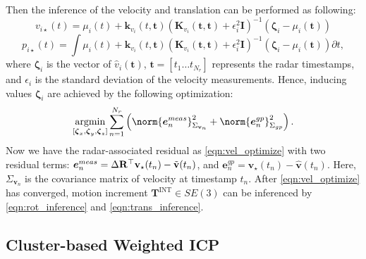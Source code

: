 Then the inference of the velocity and translation can be performed as following:
\vspace{-1mm}
\begin{equation}
    {v}_{i\star}(t)=\mu_i(t)+\mathbf{k}_{v_i}(t,\mathbf{t})(\mathbf{K}_{v_i}(\mathbf{t}, \mathbf{t})+\epsilon_i^2\mathbf{I})^{-1}(\boldsymbol{\zeta}_i-\mu_i(\mathbf{t}))
\end{equation}
\begin{equation}
\label{eqn:trans_inference}
    {p}_{i\star}(t)=\int \mu_i(t)+\mathbf{k}_{v_i}(t,\mathbf{t})(\mathbf{K}_{v_i}(\mathbf{t}, \mathbf{t})+\epsilon_i^2\mathbf{I})^{-1}(\boldsymbol{\zeta}_i-\mu_i(\mathbf{t})) \partial t,
\end{equation}
where $\boldsymbol{\zeta}_i$ is the vector of $\hat{v}_i(\mathbf{t})$, $\mathbf{t}=[t_1\dots t_{N_r}]$ represents the radar timestamps, and $\epsilon_i$ is the standard deviation of the velocity measurements.
Hence, inducing values $\boldsymbol{\zeta}_i$ are achieved by the following optimization:
\vspace{-1mm}
\begin{equation}
\label{eqn:vel_optimize}
    \displaystyle \argmin_{[\boldsymbol{\zeta}_x, \boldsymbol{\zeta}_y, \boldsymbol{\zeta}_z]}\sum_{n=1}^{N_r} \left( \norm{\boldsymbol{e}_n^{meas}}_{\Sigma_{\mathbf{v}_n}}^2+\norm{\boldsymbol{e}_n^{gp}}_{\Sigma_{gp}}^2 \right).
\end{equation}
Now we have the radar-associated residual as \eqref{eqn:vel_optimize} with two residual terms: $\boldsymbol{e}_n^{meas} = \Delta{\mathbf{R}^\top}\mathbf{v}_\star(t_n)-\Tilde{\mathbf{v}}(t_n)$, and $\boldsymbol{e}_n^{gp}=\mathbf{v}_{\star}(t_n)-\hat{\mathbf{v}}(t_n)$. Here, $\Sigma_{\mathbf{v}_n}$ is the covariance matrix of velocity at timestamp $t_n$. After \eqref{eqn:vel_optimize} has converged, motion increment $\textbf{T}^{\text{INT}}\in SE(3)$ can be inferenced by \eqref{eqn:rot_inference} and \eqref{eqn:trans_inference}.

\subsection{Cluster-based Weighted ICP}
\label{subsec:scan matching}

